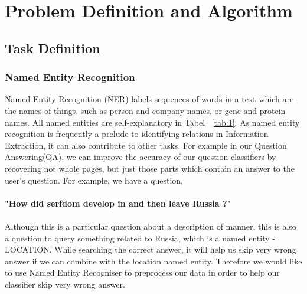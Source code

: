 \documentclass[10pt,twocolumn,letterpaper]{article}
\begin{document}
\section{Problem Definition and Algorithm}
\subsection{Task Definition}

\subsubsection{Named Entity Recognition}
Named Entity Recognition (NER) labels sequences of words in a text which are the names of things, such as person and company names, or gene and protein names. All named entities are self-explanatory in Tabel ~\ref{tab:1}. As named entity recognition is frequently a prelude to identifying relations in Information Extraction, it can also contribute to other tasks. For example in our Question Answering(QA), we can improve the accuracy of our question classifiers by recovering not whole pages, but just those parts which contain an answer to the user's question. For example, we have a question, \\\\{\bf "How did serfdom develop in and then leave Russia ?"} \\\\Although this is a particular question about a description of manner, this is also a question to query something related to Russia, which is a named entity - LOCATION. While searching the correct answer, it will help us skip very wrong answer if we can combine with the location named entity. Therefore we would like to use Named Entity Recogniser to preprocess our data in order to help our classifier skip very wrong answer.
	\begin{table}[!hbt]
		\caption{NER}
		\label{tab:1}
	\end{table}
\end{document}
